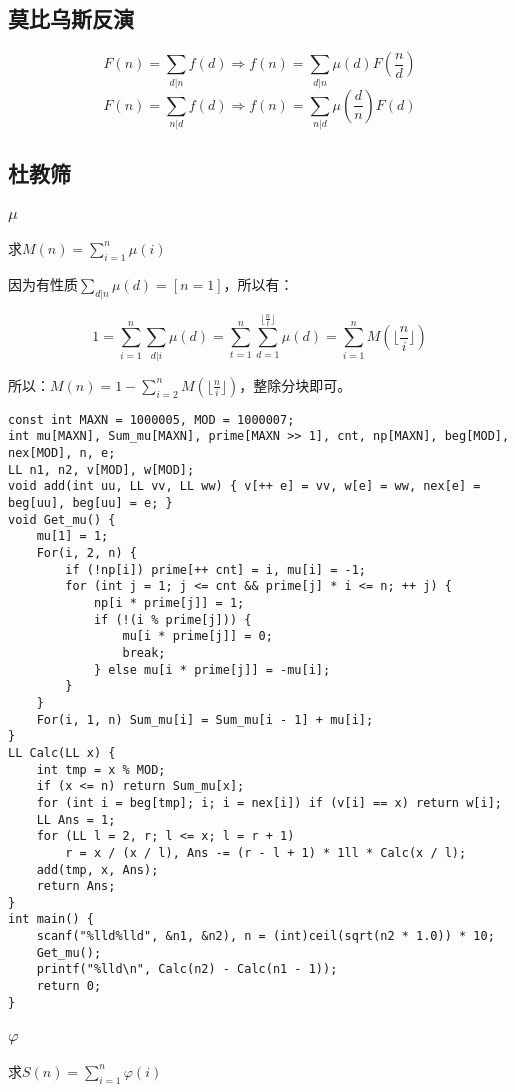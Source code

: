 \documentclass[twocolumn,a4]{article}
\begin{document}
\subsection{莫比乌斯反演}
$$F(n)=\sum_{d|n}f(d)\Rightarrow f(n)=\sum_{d|n}\mu (d)F(\frac{n}{d})$$
$$F(n)=\sum_{n|d}f(d)\Rightarrow f(n)=\sum_{n|d}\mu(\frac{d}{n})F(d)$$
\subsection{杜教筛}
\subsubsection{$\mu$}
求$M(n)=\sum_{i=1}^{n}\mu(i)$

因为有性质$\sum_{d|n}\mu(d)=[n=1]$，所以有：

$$1=\sum_{i=1}^{n}\sum_{d|i}\mu(d)=\sum_{t=1}^{n}\sum_{d=1}^{\lfloor \frac{n}{t}\rfloor}\mu(d)=\sum_{i=1}^{n}M(\lfloor \frac{n}{i}\rfloor)$$

所以：$M(n)=1-\sum_{i=2}^{n}M(\lfloor \frac{n}{i} \rfloor)$，整除分块即可。
\begin{lstlisting}
const int MAXN = 1000005, MOD = 1000007;
int mu[MAXN], Sum_mu[MAXN], prime[MAXN >> 1], cnt, np[MAXN], beg[MOD], nex[MOD], n, e;
LL n1, n2, v[MOD], w[MOD];
void add(int uu, LL vv, LL ww) { v[++ e] = vv, w[e] = ww, nex[e] = beg[uu], beg[uu] = e; }
void Get_mu() {
    mu[1] = 1;
    For(i, 2, n) {
        if (!np[i]) prime[++ cnt] = i, mu[i] = -1;
        for (int j = 1; j <= cnt && prime[j] * i <= n; ++ j) {
            np[i * prime[j]] = 1;
            if (!(i % prime[j])) {
                mu[i * prime[j]] = 0;
                break;
            } else mu[i * prime[j]] = -mu[i];
        }
    }
    For(i, 1, n) Sum_mu[i] = Sum_mu[i - 1] + mu[i];
}
LL Calc(LL x) {
    int tmp = x % MOD;
    if (x <= n) return Sum_mu[x];
    for (int i = beg[tmp]; i; i = nex[i]) if (v[i] == x) return w[i];
    LL Ans = 1;
    for (LL l = 2, r; l <= x; l = r + 1)
        r = x / (x / l), Ans -= (r - l + 1) * 1ll * Calc(x / l);
    add(tmp, x, Ans);
    return Ans;
}
int main() {
    scanf("%lld%lld", &n1, &n2), n = (int)ceil(sqrt(n2 * 1.0)) * 10;
    Get_mu();
    printf("%lld\n", Calc(n2) - Calc(n1 - 1));
    return 0;
}
\end{lstlisting}
\subsubsection{$\varphi$}
求$S(n)=\sum_{i=1}^{n}\varphi(i)$
\end{document}
